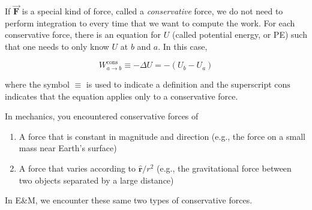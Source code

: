 \documentclass{article}
\newcommand{\rhat}[0]{\hat{\mathbf{r}}}
\newcommand{\bfvec}[1]{\vec{\mathbf{#1}}}
\begin{document}
If $\bfvec{F}$ is a special kind of force, called a \emph{conservative} force, we do not need to perform integration to every time that we want to compute the work. For each conservative force, there is an equation for $U$ (called potential energy, or PE) such that one needs to only know $U$ at $b$ and $a$. In this case,

$$
W_{a\rightarrow b}^{\text{cons}} \equiv -\Delta U = -(U_b-U_a)
$$

where the symbol $\equiv$ is used to indicate a definition and the superscript $\text{cons}$ indicates that the equation applies only to a conservative force.

In mechanics, you encountered conservative forces of

\begin{enumerate}

  \item A force that is constant in magnitude and direction (e.g., the force on a small mass near Earth's surface)

  \item A force that varies according to $\rhat/r^2$ (e.g., the gravitational force between two objects separated by a large distance)

\end{enumerate}

In E&M, we encounter these same two types of conservative forces.



\end{document}
